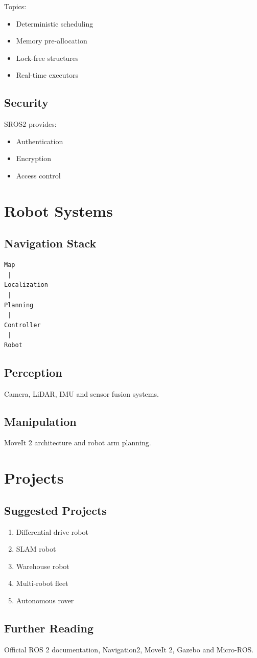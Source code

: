 \documentclass[11pt,oneside]{book}
\begin{document}
Topics:

\begin{itemize}
\item Deterministic scheduling
\item Memory pre-allocation
\item Lock-free structures
\item Real-time executors
\end{itemize}

\chapter{Security}

SROS2 provides:

\begin{itemize}
\item Authentication
\item Encryption
\item Access control
\end{itemize}

\part{Robot Systems}

\chapter{Navigation Stack}

\begin{verbatim}
Map
 |
Localization
 |
Planning
 |
Controller
 |
Robot
\end{verbatim}

\chapter{Perception}

Camera, LiDAR, IMU and sensor fusion systems.

\chapter{Manipulation}

MoveIt 2 architecture and robot arm planning.

\part{Projects}

\chapter{Suggested Projects}

\begin{enumerate}
\item Differential drive robot
\item SLAM robot
\item Warehouse robot
\item Multi-robot fleet
\item Autonomous rover
\end{enumerate}

\backmatter

\chapter{Further Reading}

Official ROS 2 documentation, Navigation2, MoveIt 2, Gazebo and Micro-ROS.
\end{document}
